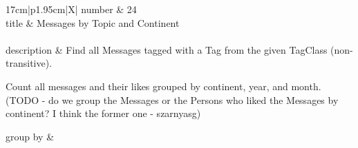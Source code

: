 \renewcommand*{\arraystretch}{1.5}
\noindent\begin{tabularx}{17cm}{|p{1.95cm}|X|}
	\hline
	number      & 24                                                          \\ \hline
	title       & Messages by Topic and Continent                                                           \\ \hline
	 \\ \hline
	description & Find all Messages tagged with a Tag from the given TagClass
(non-transitive).

Count all messages and their likes grouped by continent, year, and
month. (TODO - do we group the Messages or the Persons who liked the
Messages by continent? I think the former one - szarnyasg)
 \\ \hline
	
	group by       &
	\\ \hline
	

\end{tabularx}
